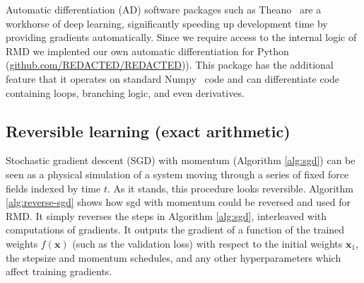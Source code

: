 \documentclass{article}
\newcommand{\vx}{\mathbf{x}}
\begin{document}
Automatic differentiation (AD) software packages such as
Theano~\cite{Bastien-Theano-2012, bergstra2010scipy} are a workhorse of deep
learning, significantly speeding up development time by providing gradients
automatically. Since we require access to the internal logic of RMD we implented
our own automatic differentiation for Python
(\url{github.com/REDACTED/REDACTED})).
This package has the additional feature that it operates on standard
Numpy~\cite{oliphant2007python} code and can differentiate code containing
loops, branching logic, and even derivatives.

\subsection{Reversible learning (exact arithmetic)}
\label{sec:reversible learning}

Stochastic gradient descent (SGD) with momentum (Algorithm \ref{alg:sgd}) can be
seen as a physical simulation of a system moving through a series of fixed force
fields indexed by time $t$. As it stands, this procedure looks
reversible. Algorithm \ref{alg:reverse-sgd} shows how sgd with momentum could be
reversed and used for RMD. It simply reverses the steps in Algorithm
\ref{alg:sgd}, interleaved with computations of gradients. It outputs the
gradient of a function of the trained weights $f(\vx)$ (such as the validation
loss) with respect to the initial weights $\vx_1$, the stepsize and momentum
schedules, and any other hyperparameters which affect training gradients.
\end{document}
